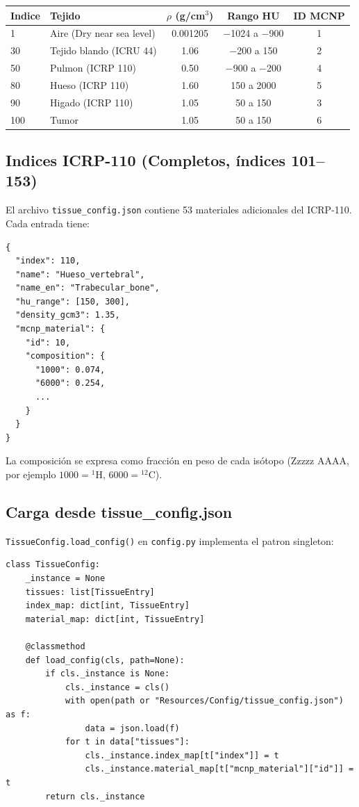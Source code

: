 \documentclass[12pt,a4paper]{article}
\begin{document}
\begin{center}
\begin{tabular}{llccc}
\toprule
\textbf{Indice} & \textbf{Tejido} & $\rho$ (g/cm$^3$) & \textbf{Rango HU} & \textbf{ID MCNP} \\
\midrule
1 & Aire (Dry near sea level) & 0.001205 & $-$1024 a $-$900 & 1 \\
30 & Tejido blando (ICRU 44) & 1.06 & $-$200 a 150 & 2 \\
50 & Pulmon (ICRP 110) & 0.50 & $-$900 a $-$200 & 4 \\
80 & Hueso (ICRP 110) & 1.60 & 150 a 2000 & 5 \\
90 & Higado (ICRP 110) & 1.05 & 50 a 150 & 3 \\
100 & Tumor & 1.05 & 50 a 150 & 6 \\
\bottomrule
\end{tabular}
\end{center}

\subsection{Indices ICRP-110 (Completos, índices 101--153)}

El archivo \texttt{tissue\_config.json} contiene 53 materiales adicionales del ICRP-110. Cada entrada tiene:

\begin{lstlisting}
{
  "index": 110,
  "name": "Hueso_vertebral",
  "name_en": "Trabecular_bone",
  "hu_range": [150, 300],
  "density_gcm3": 1.35,
  "mcnp_material": {
    "id": 10,
    "composition": {
      "1000": 0.074,
      "6000": 0.254,
      ...
    }
  }
}
\end{lstlisting}

La composición se expresa como fracción en peso de cada isótopo (Zzzzz AAAA, por ejemplo $1000 = {}^1$H, $6000 = {}^{12}$C).

\subsection{Carga desde tissue\_config.json}

\texttt{TissueConfig.load\_config()} en \texttt{config.py} implementa el patron singleton:

\begin{lstlisting}
class TissueConfig:
    _instance = None
    tissues: list[TissueEntry]
    index_map: dict[int, TissueEntry]
    material_map: dict[int, TissueEntry]

    @classmethod
    def load_config(cls, path=None):
        if cls._instance is None:
            cls._instance = cls()
            with open(path or "Resources/Config/tissue_config.json") as f:
                data = json.load(f)
            for t in data["tissues"]:
                cls._instance.index_map[t["index"]] = t
                cls._instance.material_map[t["mcnp_material"]["id"]] = t
        return cls._instance
\end{lstlisting}
\end{document}
